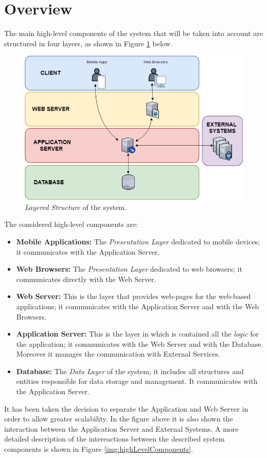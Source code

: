 \section{Overview}
The main high-level components of the system that will be taken into account are structured in four layers, as shown in Figure \ref{img:layeredStructure} below.

\begin{figure}[H]
  \begin{center}
  	\includegraphics[width=\textwidth]{./img/LayeredStructure.png}
    \hspace{0.05\linewidth}
    \centering
    \caption{\textit{Layered Structure} of the system.}
		\label{img:layeredStructure}
    \end{center}
\end{figure}

The considered high-level components are:
\begin{itemize}
  \setlength{\itemindent}{-.4in}
  \item[] \textbf{Mobile Applications:} The \textit{Presentation Layer} dedicated to mobile devices; it communicates with the Application Server.
  \item[] \textbf{Web Browsers:} The \textit{Presentation Layer} dedicated to web browsers; it communicates directly with the Web Server.
  \item[] \textbf{Web Server:} This is the layer that provides web-pages for the web-based applications; it communicates with the Application Server and with the Web Browsers.
  \item[] \textbf{Application Server:} This is the layer in which is contained all the \textit{logic} for the application; it communicates with the Web Server and with the Database. Moreover it manages the communication with External Services.
  \item[] \textbf{Database:}  The \textit{Data Layer} of the system; it includes all structures and entities responsible for data storage and management. It communicates with the Application Server.
\end{itemize}
It has been taken the decision to separate the Application and Web Server in order to allow greater scalability. In the figure above it is also shown the interaction between the Application Server and External Systems.
A more detailed description of the intereactions between the described system components is shown in Figure \ref{img:highLevelComponents}.

